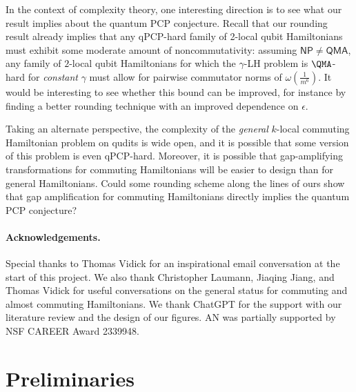\documentclass[a4paper,onecolumn,11pt]{quantumarticle}
\theoremstyle{plain}
\begin{document}
In the context of complexity theory, one interesting direction is to see what our result implies about the quantum PCP conjecture. Recall that our rounding result already implies that any qPCP-hard family of 2-local qubit Hamiltonians must exhibit some moderate amount of noncommutativity: assuming $\mathsf{NP} \neq \mathsf{QMA}$, any
family of $2$-local qubit Hamiltonians for which the $\gamma$-LH problem is $\QMA$-hard for \emph{constant} $\gamma$ must allow for pairwise commutator norms of $\omega(\frac{1}{m^6})$. It would be interesting to see whether this bound can be improved, for instance by finding a better rounding technique with an improved dependence on $\epsilon$.

Taking an alternate perspective, the complexity of the \emph{general} $k$-local commuting Hamiltonian problem on qudits is wide open, and it is possible that some version of this problem is even qPCP-hard. Moreover, it is possible that gap-amplifying transformations for commuting Hamiltonians will be easier to design than for general Hamiltonians. Could some rounding scheme along the lines of ours show that gap amplification for commuting Hamiltonians directly implies the quantum PCP conjecture?

\paragraph{Acknowledgements.}
Special thanks to Thomas Vidick for an inspirational email conversation at the start of this project. We also thank Christopher Laumann, Jiaqing Jiang, and Thomas Vidick for useful conversations on the general status for commuting and almost commuting Hamiltonians. We thank ChatGPT for the support with our literature review and the design of our figures. AN was partially supported by NSF CAREER Award 2339948.

\section{Preliminaries}
\label{sec:background}
\end{document}
